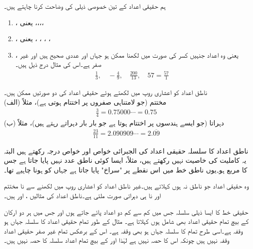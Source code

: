 ہم حقیقی اعداد کے تین خصوصی ذیلی  کی وضاحت کرنا چاہتے ہیں۔
\begin{enumerate}[1.]
\item
{}، یعنی ،،،،
\item
{}، یعنی ، ، ، ،
\item
{}، یعنی وہ اعداد جنہیں کسر  کی صورت میں لکھنا ممکن ہو جہاں  اور  عددی صحیح ہیں اور  غیر صفر  ہے۔اس کی مثال درج ذیل ہیں۔
\begin{align*}
\frac{1}{3},\quad -\frac{4}{9},\quad \frac{200}{13}, \quad 57=\frac{57}{1}
\end{align*} 
\end{enumerate}
ناطق اعداد کو اعشاری روپ میں لکھتے ہوئے حقیقی اعداد کی دو صورتیں ممکن ہیں۔\\
(الف) \quad
مختتم (جو لامتناہی صفروں پر اختتام ہوتی ہے)، مثلاً
\begin{align*}
\frac{3}{4}=0.75000\cdots=0.75
\end{align*}
(ب)\quad
دہراتا (جو ایسے ہندسوں پر اختتام ہوتا ہے جو بار بار دہراتے رہتے ہیں)، مثلاً
\begin{align*}
\frac{23}{11}=2.090909\cdots=2.\overline{09}
\end{align*}

ناطق اعداد  کا سلسلہ حقیقی اعداد کی  الجبرائی خواص اور خواص درجہ رکھتے ہیں البتہ یہ کاملیت کی خاصیت نہیں رکھتے ہیں، مثلاً، ایسا کوئی ناطق عدد نہیں پایا جاتا ہے جس کا مربع  ہو۔یوں ناطق خط میں اس نقطے پر "سراخ" پایا جاتا ہے جہاں  کو ہونا چاہیے تھا۔

وہ حقیقی اعداد جو ناطق نہ ہوں  کہلاتے ہیں۔غیر ناطق اعداد کو اعشاری روپ میں لکھنے سے نا مختتم اور نا ہی دہراتی صورت ملتی ہے۔ناطق اعداد  کی مثالیں ،  اور  ہیں۔

حقیقی خط کا ایسا ذیلی سلسلہ جس میں کم سے کم دو اعداد پائے جاتے ہوں اور جس میں ہر دو ارکان کے بیچ تمام  حقیقی اعداد بھی  شامل ہوں  کہلاتا ہے۔ مثال کے طور تمام حقیقی اعداد  کا سلسلہ جہاں  ہو وقفہ ہے۔اسی طرح تمام  کا سلسلہ جہاں  ہو بھی وقفہ ہے۔ اس کے برعکس تمام غیر صفر حقیقی اعداد وقفہ نہیں ہیں چونکہ  اس کا حصہ نہیں ہے لہٰذا  اور  کے بیچ تمام اعداد سلسلہ کا حصہ نہیں ہیں۔

